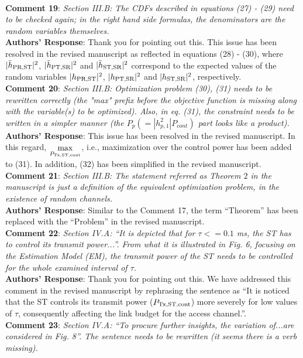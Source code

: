 \documentclass[12pt,a4wide,peerreview]{IEEEtran}
\newcommand{\tc}[1]{#1}
\begin{document}
\\
\textbf{\tc{Comment 19}}: 
\textit{
Section III.B: The CDFs described in equations (27) - (29) need to be checked again; in the right hand side formulas, the denominators are the random variables themselves.
}
\\
\textbf{Authors' Response}:
Thank you for pointing out this. This issue has been resolved in the revised manuscript as reflected in equations (28) - (30), where $|\bar{h}_{\text{PR,ST}}|^2$, $|\bar{h}_{\text{PT,SR}}|^2$ and $|\bar{h}_{\text{ST,SR}}|^2$ correspond to the expected values of the random variables $|h_{\text{PR,ST}}|^2$, $|h_{\text{PT,SR}}|^2$ and $|h_{\text{ST,SR}}|^2$, respectively.
\\
\textbf{\tc{Comment 20}}: 
\textit{
Section III.B: Optimization problem (30), (31) needs to be rewritten correctly (the "max" prefix before the objective function is missing along with the variable(s) to be optimized). Also, in eq. (31), the constraint needs to be written in a simpler manner (the $P_p (= |h_{p,1}^2| P_{cont})$ 
part looks like a product).
}
\\
\textbf{Authors' Response}:
This issue has been resolved in the revised manuscript. In this regard, $\underset{P_{\text{Tx,ST,cont}}}{\operatorname*{max}}$, i.e., maximization over the control power has been added to (31). In addition, (32) has been simplified in the revised manuscript.
\\
\textbf{\tc{Comment 21}}: 
\textit{
Section III.B: The statement referred as Theorem $2$ in the manuscript is just a definition of the equivalent optimization problem, in the existence of random channels.
}
\\
\textbf{Authors' Response}:
Similar to the Comment 17, the term ``Theorem'' has been replaced with the ``Problem'' in the revised manuscript. 
\\
\textbf{\tc{Comment 22}}: 
\textit{
Section IV.A: ``It is depicted that for $\tau <= 0.1$ ms, the ST has to control its transmit power...''. From what it is illustrated in Fig. 6, focusing on the Estimation Model (EM), the transmit power of the ST needs to be controlled for the whole examined interval of $\tau$.
}
\\
\textbf{Authors' Response}:
Thank you for pointing out this. We have addressed this comment in the revised manuscript by rephrasing the sentence as ``It is noticed that the ST controls its transmit power ($P_{\text{Tx,ST,cont}}$) more severely for low values of $\tau$, consequently affecting the link budget for the access channel.''. 
\\
\textbf{\tc{Comment 23}}: 
\textit{
Section IV.A: ``To procure further insights, the variation of...are considered in Fig. 8''. The sentence needs to be rewritten (it seems there is a verb missing).
}
\end{document}
